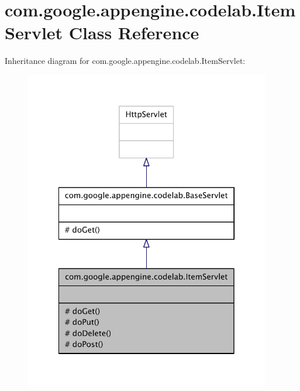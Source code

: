 \hypertarget{classcom_1_1google_1_1appengine_1_1codelab_1_1_item_servlet}{\section{com.\-google.\-appengine.\-codelab.\-Item\-Servlet Class Reference}
\label{classcom_1_1google_1_1appengine_1_1codelab_1_1_item_servlet}
}


Inheritance diagram for com.\-google.\-appengine.\-codelab.\-Item\-Servlet\-:
\nopagebreak
\begin{figure}[H]
\begin{center}
\leavevmode
\includegraphics[width=304pt]{classcom_1_1google_1_1appengine_1_1codelab_1_1_item_servlet__inherit__graph}
\end{center}
\end{figure}


